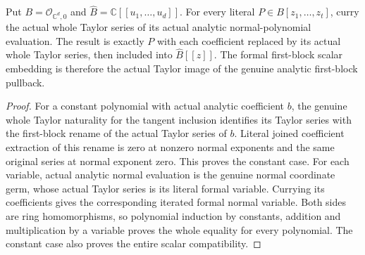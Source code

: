 \begin{theorem}
\label{hir:actual-relative-polynomial-whole-taylor-dictionary}
\leanok
Put $B=\mathcal O_{\mathbb C^d,0}$ and
$\widehat B=\mathbb C[[u_1,\ldots,u_d]]$. For every literal
$P\in B[z_1,\ldots,z_t]$, curry the actual whole Taylor series of its
actual analytic normal-polynomial evaluation. The result is exactly
$P$ with each coefficient replaced by its actual whole Taylor series,
then included into $\widehat B[[z]]$. The formal first-block scalar
embedding is therefore the actual Taylor image of the genuine analytic
first-block pullback.
\end{theorem}
\begin{proof}
For a constant polynomial with actual analytic coefficient $b$, the
genuine whole Taylor naturality for the tangent inclusion identifies
its Taylor series with the first-block rename of the actual Taylor
series of $b$. Literal joined coefficient extraction of this rename
is zero at nonzero normal exponents and the same original series at
normal exponent zero. This proves the constant case. For each variable,
actual analytic normal evaluation is the genuine normal coordinate
germ, whose actual Taylor series is its literal formal variable.
Currying its coefficients gives the corresponding iterated formal
normal variable. Both sides are ring homomorphisms, so polynomial
induction by constants, addition and multiplication by a variable
proves the whole equality for every polynomial. The constant case
also proves the entire scalar compatibility.
\end{proof}


